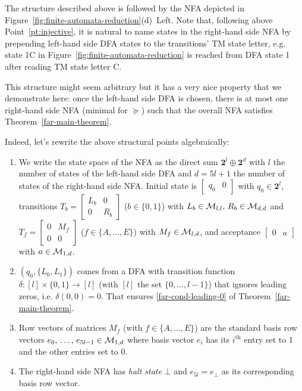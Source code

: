 \begin{example}
  The structure described above is followed by the NFA depicted in Figure~\ref{fig:finite-automata-reduction}(d)~Left. Note that, following above Point~\ref{pt:injective}, it is natural to name states in the right-hand side NFA by prepending left-hand side DFA states to the transitions' TM state letter, e.g. state 1C in Figure~\ref{fig:finite-automata-reduction} is reached from DFA state 1 after reading TM state letter C.
\end{example}

This structure might seem arbitrary but it has a very nice property that we demonstrate here: once the left-hand side DFA is chosen, there is at most one right-hand side NFA (minimal for $\succeq$) such that the overall NFA satisfies Theorem~\ref{far-main-theorem}.



Indeed, let's rewrite the above structural points algebraically:


\begin{enumerate}
  \item We write the state space of the NFA as the direct sum $\mathbf{2}^l \oplus \mathbf{2}^d$ with $l$ the number of states of the left-hand side DFA and $d=5l+1$ the number of states of the right-hand side NFA. Initial state is $\begin{bmatrix}q_0&0\end{bmatrix}$ with $q_0 \in \mathbf{2}^l$,
        transitions
        $T_b=\begin{bmatrix}L_b&0\\0&R_b\end{bmatrix}$ ($b\in\{0,1\}$) with $L_b \in \mathcal{M}_{l,l},\, R_b \in \mathcal{M}_{d,d}$ and
        $T_f=\begin{bmatrix}0&M_f\\0&0\end{bmatrix}$ ($f\in\{A,\ldots,E\}$) with $M_f \in \mathcal{M}_{l,d}$,
        and acceptance $\begin{bmatrix}0&a\end{bmatrix}$ with $a \in \mathcal{M}_{1,d}$.
  \item $(q_0,\{L_0, L_1\})$ comes from a DFA with transition function $\delta: [l] \times \{0,1\} \to [l]$ (with $[l]$ the set $\{0,\dots,l-1\}$) that ignores leading zeros, i.e. $\delta(0,0) = 0$. That ensures \eqref{far-cond-leading-0} of Theorem~\ref{far-main-theorem}.
  \item Row vectors of matrices $M_f$ (with $f\in\{A,\ldots,E\}$) are the standard basis row vectors $e_0,\, \dots,\, e_{5l-1} \in \mathcal{M}_{1,d}$ where basis vector $e_i$ has its $i^\text{th}$ entry set to 1 and the other entries set to 0.\label{pt:basis}
  \item The right-hand side NFA has \textit{halt state} $\bot$ and $e_{5l} = e_\bot$ as its corresponding basis row vector.

\end{enumerate}


